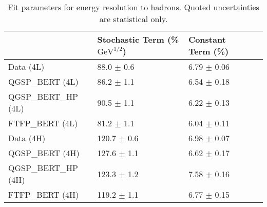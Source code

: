 \begin{table}[!htb]
\begin{center}
\begin{tabular}{|l|l|l|l|}
\hline
& Stochastic Term (\% $\mathrm{GeV}^{1/2}$) & Constant Term (\%) \\
\hline
Data (4L) & 88.0 $\pm$ 0.6 & 6.79 $\pm$ 0.06\\
QGSP\_BERT (4L) & 86.2 $\pm$ 1.1 & 6.54 $\pm$ 0.18\\
QGSP\_BERT\_HP (4L) & 90.5 $\pm$ 1.1 & 6.22 $\pm$ 0.13\\
FTFP\_BERT (4L) & 81.2 $\pm$ 1.1 & 6.04 $\pm$ 0.11\\
Data (4H) & 120.7 $\pm$ 0.6 & 6.98 $\pm$ 0.07\\
QGSP\_BERT (4H) & 127.6 $\pm$ 1.1 & 6.62 $\pm$ 0.17\\
QGSP\_BERT\_HP (4H) & 123.3 $\pm$ 1.2 & 7.58 $\pm$ 0.16\\
FTFP\_BERT (4H) & 119.2 $\pm$ 1.1 & 6.77 $\pm$ 0.15\\
\hline
\end{tabular}
\end{center}
\caption[Hadron resolution results]{Fit parameters for energy resolution to hadrons. Quoted uncertainties are statistical only.}
\label{table_resolution_hadrons}
\end{table}

